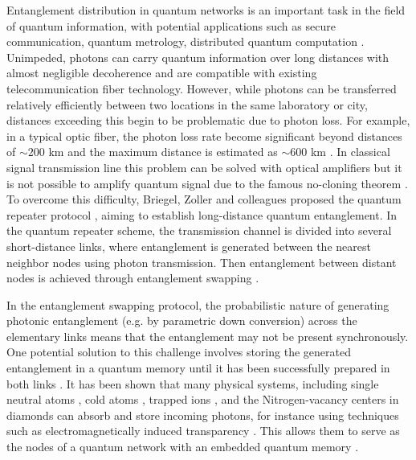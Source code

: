 \documentclass{WileyMSP-template}
\begin{document}
Entanglement distribution in quantum networks is an important task in the field of quantum information, with potential applications such as secure communication, quantum metrology, distributed quantum computation \cite{Wei2022,Wehner2018,Azuma2023}. Unimpeded, photons can carry quantum information over long distances with almost negligible decoherence \cite{yin2017satellite,ren2017ground,lu2022micius,berera20,berera21} and are compatible with existing telecommunication fiber technology.
However, while photons can be transferred relatively efficiently between two locations in the same laboratory or city, distances exceeding this begin to be problematic due to photon loss.
For example, in a typical optic fiber, the photon loss rate become significant beyond distances of $ \sim 200 $ km and the maximum distance is estimated as $\sim 600$ km \cite{Pirandola2017, Yingqiu2021}.
In classical signal transmission line this problem can be solved with optical amplifiers but it is not possible to amplify quantum signal due to the famous no-cloning theorem \cite{Park1970, Wootters1982, Nielsen2010}. To overcome this difficulty, Briegel, Zoller and colleagues proposed the quantum repeater protocol \cite{Briegel1998},
aiming to establish long-distance quantum entanglement.
In the quantum repeater scheme, the transmission channel is divided into several short-distance links, where entanglement is generated between the nearest neighbor nodes using photon transmission.  Then entanglement between distant nodes is achieved through entanglement swapping \cite{bennett1993teleporting,zukowski1993event,Pan1998}.

In the entanglement swapping protocol, the probabilistic nature of generating photonic entanglement (e.g. by parametric down conversion) across the elementary links means that the entanglement may not be present synchronously.  One potential solution to this challenge involves storing the generated entanglement in a quantum memory until it has been successfully prepared in both links \cite{Lvovsky2009, Simon2010, Heshami2016}. It has been shown that many physical systems, including single neutral atoms \cite{Reiserer2015,Rosenfeld2008},
cold atoms \cite{Sangouard2011},
trapped ions \cite{Duan2010},
and the Nitrogen-vacancy centers in diamonds \cite{Childress2006, Gurudev2007,hermans2022qubit}
can absorb and store incoming photons,
for instance using techniques such as electromagnetically induced transparency \cite{Fleischhauer2005}.  This allows them to serve as the nodes of a quantum network with an embedded quantum memory \cite{Duan2001,Duan2010,Ritter2012}.
\end{document}
